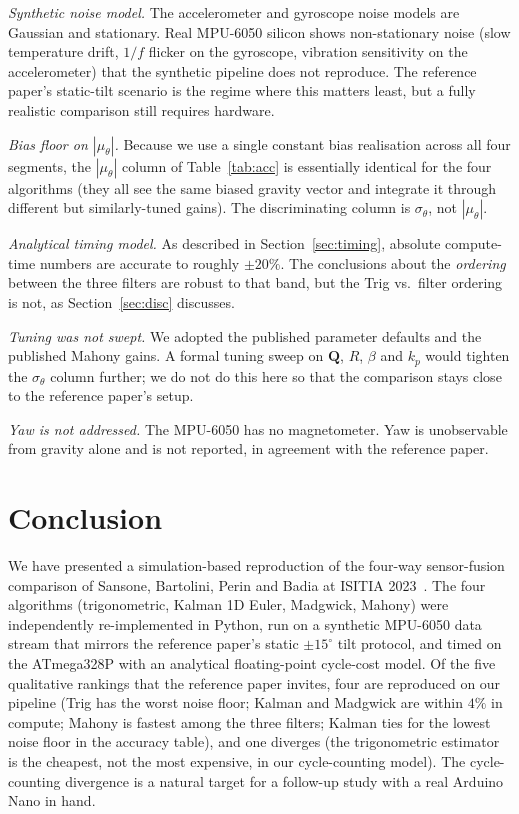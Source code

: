 \documentclass[conference]{IEEEtran}
\newcommand{\bm}[1]{\mathbf{#1}}
\newcommand{\degr}{^{\circ}}
\begin{document}
\textit{Synthetic noise model.} The accelerometer and gyroscope
noise models are Gaussian and stationary. Real MPU-6050 silicon
shows non-stationary noise (slow temperature drift, $1/f$ flicker
on the gyroscope, vibration sensitivity on the accelerometer)
that the synthetic pipeline does not reproduce. The reference
paper's static-tilt scenario is the regime where this matters
least, but a fully realistic comparison still requires hardware.

\textit{Bias floor on $|\mu_\theta|$.} Because we use a single
constant bias realisation across all four segments, the
$|\mu_\theta|$ column of Table~\ref{tab:acc} is essentially
identical for the four algorithms (they all see the same biased
gravity vector and integrate it through different but
similarly-tuned gains). The discriminating column is
$\sigma_\theta$, not $|\mu_\theta|$.

\textit{Analytical timing model.} As described in
Section~\ref{sec:timing}, absolute compute-time numbers are
accurate to roughly $\pm 20\%$. The conclusions about the
\emph{ordering} between the three filters are robust to that
band, but the Trig vs.~filter ordering is not, as
Section~\ref{sec:disc} discusses.

\textit{Tuning was not swept.} We adopted the published parameter
defaults and the published Mahony gains. A formal tuning sweep on
$\bm{Q}$, $R$, $\beta$ and $k_p$ would tighten the
$\sigma_\theta$ column further; we do not do this here so that
the comparison stays close to the reference paper's setup.

\textit{Yaw is not addressed.} The MPU-6050 has no magnetometer.
Yaw is unobservable from gravity alone and is not reported, in
agreement with the reference paper.

\section{Conclusion}\label{sec:conclusion}

We have presented a simulation-based reproduction of the four-way
sensor-fusion comparison of Sansone, Bartolini, Perin and Badia at
ISITIA 2023~\cite{badia2023}. The four algorithms (trigonometric,
Kalman 1D Euler, Madgwick, Mahony) were independently
re-implemented in Python, run on a synthetic MPU-6050 data stream
that mirrors the reference paper's static $\pm 15\degr$ tilt
protocol, and timed on the ATmega328P with an analytical
floating-point cycle-cost model. Of the five qualitative
rankings that the reference paper invites, four are reproduced
on our pipeline (Trig has the worst noise floor; Kalman and
Madgwick are within $4\%$ in compute; Mahony is fastest among
the three filters; Kalman ties for the lowest noise floor in the
accuracy table), and one diverges (the trigonometric estimator is
the cheapest, not the most expensive, in our cycle-counting
model). The cycle-counting divergence is a natural target for a
follow-up study with a real Arduino Nano in hand.
\end{document}
